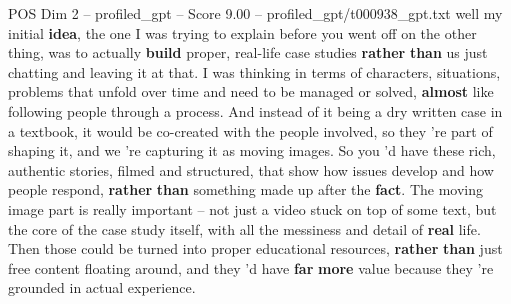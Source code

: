 \begin{textsample}{POS Dim 2 – profiled\_gpt – Score 9.00 – profiled\_gpt/t000938\_gpt.txt}  \label{ex:f2_pos_003}
well my initial \textbf{idea}, the one I was trying to explain before you went off on the other thing, was to actually \textbf{build} proper, real-life case studies \textbf{rather} \textbf{than} us just chatting and leaving it at that.
I was thinking in terms of characters, situations, problems that unfold over time and need to be managed or solved, \textbf{almost} like following people through a process.
And instead of it being a dry written case in a textbook, it would be co-created with the people involved, so they ’re part of shaping it, and we ’re capturing it as moving images.
So you ’d have these rich, authentic stories, filmed and structured, that show how issues develop and how people respond, \textbf{rather} \textbf{than} something made up after the \textbf{fact}.
The moving image part is really important – not just a video stuck on top of some text, but the core of the case study itself, with all the messiness and detail of \textbf{real} life.
Then those could be turned into proper educational resources, \textbf{rather} \textbf{than} just free content floating around, and they ’d have \textbf{far} \textbf{more} value because they ’re grounded in actual experience.

\end{textsample}
